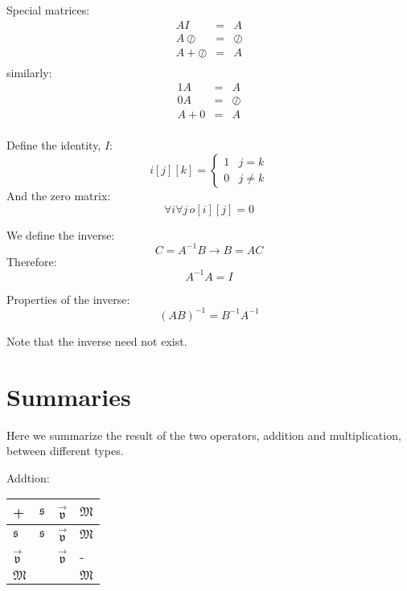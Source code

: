 \documentclass{article}
\newcommand{\scalarclass}{\mathfrak{s}}
\newcommand{\vectorclass}{\vec{\mathfrak{v}}}
\newcommand{\matrixclass}{\mathfrak{M}}
\newcommand{\zeromatrix}{\oslash}
\newcommand{\identity}{I}
\begin{document}
Special matrices:
\begin{eqnarray}
	A \identity & = & A \\
	A \zeromatrix & = & \zeromatrix \\
	A + \zeromatrix & = & A \\
\end{eqnarray}
similarly:
\begin{eqnarray}
	1 A & = & A \\
	0 A & = & \zeromatrix \\
	A + 0 & = & A \\
\end{eqnarray}

Define the identity, $\identity$:
\begin{equation}
	i[j][k] = \left \lbrace \begin{array}{lr}
	1 & j = k \\
	0 & j \ne k
\end{array} \right .
\end{equation}
And the zero matrix:
\begin{equation}
	\forall i \forall j \, o[i][j]=0
\end{equation}

We define the inverse:
\begin{equation}
	C = A^{-1} B \rightarrow B = A C
\end{equation}
Therefore:
\begin{equation}
	A^{-1} A = \identity
\end{equation}

Properties of the inverse:
\begin{equation}
	(A B)^{-1} = B^{-1} A^{-1}
\end{equation}

Note that the inverse need not exist.

\section{Summaries}

\label{summary}

Here we summarize the result of the two operators, addition and multiplication,
between different types.

Addtion:

\begin{tabular}{|l|lll|}\hline
	+ & $\scalarclass$ & $\vectorclass$ & $\matrixclass$ \\ \hline
	$\scalarclass$ & $\scalarclass$ & $\vectorclass$ & $\matrixclass$ \\
	$\vectorclass$ & & $\vectorclass$ & - \\
	$\matrixclass$ & & & $\matrixclass$ \\\hline
\end{tabular}
\end{document}
